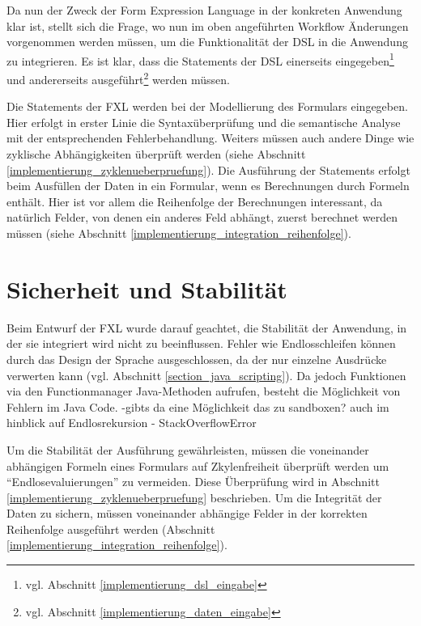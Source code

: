 Da nun der Zweck der Form Expression Language in der konkreten Anwendung klar ist, stellt sich die Frage, wo nun im oben angeführten Workflow Än\-der\-ung\-en vorgenommen werden müssen, um die Funktionalität der DSL in die Anwendung zu integrieren. Es ist klar, dass die Statements der DSL einerseits eingegeben\footnote{vgl. Abschnitt \ref{implementierung_dsl_eingabe}  } und andererseits ausgeführt\footnote{vgl. Abschnitt \ref{implementierung_daten_eingabe} } werden müssen. 

Die Statements der FXL werden bei der Modellierung des Formulars eingegeben. Hier erfolgt in erster Linie die Syntaxüberprüfung und die semantische Analyse mit der ent\-sprech\-enden Fehlerbehandlung. Weiters müssen auch andere Dinge wie zyklische Abhängigkeiten überprüft werden (siehe Abschnitt \ref{implementierung_zyklenueberpruefung}). Die Aus\-führ\-ung der Statements erfolgt beim Ausfüllen der Daten in ein Formular, wenn es Berechnungen durch Formeln enthält. Hier ist vor allem die Reihenfolge der Berechnungen interessant, da natürlich Felder, von denen ein anderes Feld abhängt, zuerst berechnet werden müssen (siehe Abschnitt \ref{implementierung_integration_reihenfolge}).


\section{Sicherheit und Stabilität}

Beim Entwurf der FXL wurde darauf geachtet, die Stabilität der Anwendung, in der sie integriert wird nicht zu beeinflussen. Fehler wie Endlosschleifen können durch das Design der Sprache ausgeschlossen, da der nur einzelne Ausdrücke verwerten kann (vgl. Abschnitt \ref{section_java_scripting}). Da jedoch Funktionen via den Functionmanager Java-Methoden aufrufen, besteht die Möglichkeit von Fehlern im Java Code. -gibts da eine Möglichkeit das zu sandboxen? auch im hinblick auf Endlosrekursion - StackOverflowError

Um die Stabilität der Ausführung gewährleisten, müssen die voneinander abhängigen Formeln eines Formulars auf Zkylenfreiheit überprüft werden um ``Endlosevaluierungen'' zu vermeiden. Diese Überprüfung wird in Abschnitt \ref{implementierung_zyklenueberpruefung} beschrieben. Um die Integrität der Daten zu sichern, müssen voneinander abhängige Felder in der korrekten Reihenfolge ausgeführt werden (Abschnitt \ref{implementierung_integration_reihenfolge}).

